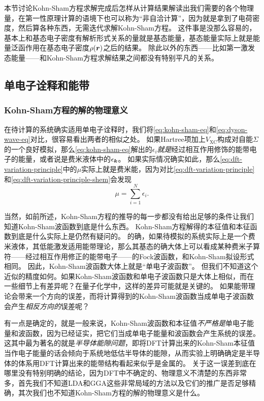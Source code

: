 本节讨论Kohn-Sham方程求解完成后怎样从计算结果解读出我们需要的各个物理量，在第一性原理计算的语境下也可以称为“非自洽计算”，因为就是拿到了电荷密度，然后算各种东西，无需迭代求解Kohn-Sham方程。
这件事是没那么容易的，基本上和基态电子密度有解析形式关系的量就是基态能量，基态能量实际上就是能量泛函作用在基态电子密度$\rho(\vb*{r})$之后的结果。
除此以外的东西——比如第一激发态能量——和Kohn-Sham方程求解结果之间都没有特别平凡的关系。

\subsection{单电子诠释和能带}\label{sec:single-electron-in-dft}

\subsubsection{Kohn-Sham方程的解的物理意义}

在待计算的系统确实适用单电子诠释时，我们将\eqref{eq:kohn-sham-eq}和\eqref{eq:dyson-wave-eq}对比，很容易看出两者的相似之处。
如果Hartree项加上$V_\text{XC}$构成对自能$\Sigma$的一个良好模拟，那么\eqref{eq:kohn-sham-eq}解出的$\epsilon_i$\emph{就是}经过相互作用修饰的能带电子的能量，或者说是费米液体中的$\epsilon_{\vb*{k}}$。
如果实际情况确实如此，那么\eqref{eq:dft-variation-principle}中的$\mu$实际上就是费米能，因为对比\eqref{eq:dft-variation-principle}和\eqref{eq:dft-variation-principle-shem}会发现
\begin{equation}
    \mu = \sum_{i=1}^N \epsilon_i.
\end{equation}

当然，如前所述，Kohn-Sham方程的推导的每一步都没有给出足够的条件让我们知道Kohn-Sham波函数到底是什么东西。
Kohn-Sham方程解得的本征值和本征函数到底是什么实际上是仍然有疑问的。
的确，如果待模拟的系统实际上是一个费米液体，其低能激发适用能带理论，那么其基态的确大体上可以看成某种费米子算符——经过相互作用修正的能带电子——的Fock波函数，和Kohn-Sham拟设形式相同。
因此，Kohn-Sham波函数大体上就是“单电子波函数”。
但我们不知道这个近似的精度如何。如果Kohn-Sham波函数和单电子波函数只是大体上相似，而在一些细节上有差异呢？在量子化学中，这样的差异可能就是关键的。
如果能带理论会带来一个方向的误差，而将计算得到的Kohn-Sham波函数当成单电子波函数会产生\emph{相反方向的}误差呢？

有一点是确定的，就是一般来说，Kohn-Sham波函数和本征值\emph{不严格是}单电子能量和波函数，因为已经证实，把它们当成单电子能量和波函数会产生系统的误差。
这其中最为著名的就是\emph{半导体能隙问题}，即将DFT计算出来的Kohn-Sham本征值当作电子能量的话会倾向于系统地低估半导体的能隙，从而实验上明确确定是半导体的体系用DFT计算出来的能带结构看起来似乎是金属的。
关于这一误差到底在哪里没有特别明确的结论，因为DFT中不确定的、物理意义不清楚的东西非常多，首先我们不知道LDA和GGA这些非常局域的方法以及它们的推广是否足够精确，其次我们也不知道Kohn-Sham方程的解的物理意义是什么。

